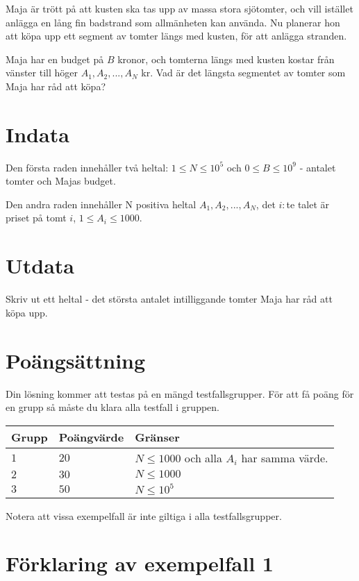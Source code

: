 Maja är trött på att kusten ska tas upp av massa stora sjötomter, och vill istället anlägga en lång fin badstrand som allmänheten kan använda.
Nu planerar hon att köpa upp ett segment av tomter längs med kusten, för att anlägga stranden.

Maja har en budget på $B$ kronor, och tomterna längs med kusten kostar från vänster till höger $A_1,A_2,...,A_N$ kr.
Vad är det längsta segmentet av tomter som Maja har råd att köpa?

\section*{Indata}
Den första raden innehåller två heltal: $1\leq N \leq 10^5$ och $0 \leq B \leq 10^9$ - antalet tomter och Majas budget.

Den andra raden innehåller N positiva heltal $A_1,A_2,...,A_N$, det $i:$te talet är priset på tomt $i$, $1\le A_i \le 1000$.


\section*{Utdata}
Skriv ut ett heltal - det största antalet intilliggande tomter Maja har råd att köpa upp.

\section*{Poängsättning}
Din lösning kommer att testas på en mängd testfallsgrupper.
För att få poäng för en grupp så måste du klara alla testfall i gruppen.

\noindent
\begin{tabular}{| l | l | p{12cm} |}
  \hline
  Grupp & Poängvärde & Gränser \\ \hline
  $1$   & $20$       & $N \leq 1000 $ och alla $A_i$ har samma värde.\\ \hline
  $2$   & $30$       & $N \leq 1000 $\\ \hline
  $3$   & $50$       & $N \leq 10^5 $  \\ \hline
\end{tabular}

Notera att vissa exempelfall är inte giltiga i alla testfallsgrupper.

\section*{Förklaring av exempelfall 1}
